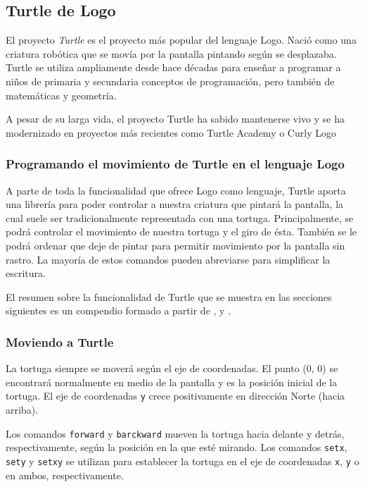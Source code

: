 \subsection{Turtle de Logo}
\label{sec:turtle}

El proyecto \emph{Turtle} es el proyecto más popular del lenguaje Logo. Nació como una criatura robótica que se movía por la pantalla pintando según se desplazaba. Turtle se utiliza ampliamente desde hace décadas para enseñar a programar a niños de primaria y secundaria conceptos de programación, pero también de matemáticas y geometría\cite{abelson1980disessa,brown1995101}. 

A pesar de su larga vida, el proyecto Turtle ha sabido mantenerse vivo y se ha modernizado en proyectos más recientes como Turtle Academy \cite{turtle-academy} o Curly Logo \cite{curly-logo}


\subsubsection{Programando el movimiento de Turtle en el lenguaje Logo}
\label{sec:logo-turtle-lenguaje}

A parte de toda la funcionalidad que ofrece Logo como lenguaje, Turtle aporta una librería para poder controlar a nuestra criatura que pintará la pantalla, la cual suele ser tradicionalmente representada con una tortuga. Principalmente, se podrá controlar el movimiento de nuestra tortuga y el giro de ésta. También se le podrá ordenar que deje de pintar para permitir movimiento por la pantalla sin rastro. La mayoría de estos comandos pueden abreviarse para simplificar la escritura. 

El resumen sobre la funcionalidad de Turtle que se muestra en las secciones siguientes es un compendio formado a partir de \cite{logo-turtle-lenguaje}, \cite{turtle-academy} y \cite{abelson1980disessa}. 


\subsubsection*{Moviendo a Turtle}

La tortuga siempre se moverá según el eje de coordenadas. El punto (0, 0) se encontrará normalmente en medio de la pantalla y es la posición inicial de la tortuga. El eje de coordenadas \texttt{y} crece positivamente en dirección Norte (hacia arriba).

Los comandos \texttt{forward} y \texttt{barckward} mueven la tortuga hacia delante y detrás, respectivamente, según la posición en la que esté mirando. Los comandos \texttt{setx}, \texttt{sety} y \texttt{setxy} se utilizan para establecer la tortuga en el eje de coordenadas \texttt{x}, \texttt{y} o en ambos, respectivamente.

